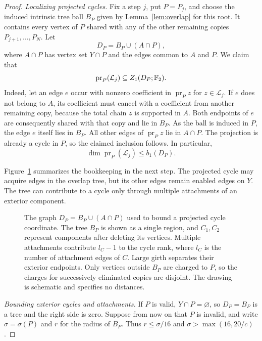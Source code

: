 \begin{proof}
\emph{Localizing projected cycles.}
Fix a step $j$, put $P=P_j$, and choose the induced intrinsic tree ball
$B_P$ given by Lemma~\ref{lem:overlap} for this root.  It contains every
vertex of $P$ shared with any of the other remaining copies
$P_{j+1},\ldots,P_N$.  Let
\[
 D_P=B_P\cup(A\cap P),
\]
where $A\cap P$ has vertex set $Y\cap P$ and the edges common to $A$
and $P$.  We claim that
\begin{equation}
 \operatorname{pr}_P(\mathcal L_j)\subseteq Z_1(D_P;\mathbb F_2).
 \label{eq:projected-cycle-support}
\end{equation}
Indeed, let an edge $e$ occur with nonzero coefficient in
$\operatorname{pr}_P z$ for $z\in\mathcal L_j$.  If $e$ does not belong
to $A$, its coefficient must cancel with a coefficient from another
remaining copy, because the total chain $z$ is supported in $A$.
Both endpoints of $e$ are consequently shared with that copy and lie
in $B_P$.  As the ball is induced in $P$, the edge $e$ itself lies in
$B_P$.  All other edges of $\operatorname{pr}_P z$ lie in $A\cap P$.
The projection is already a cycle in $P$, so the claimed inclusion
follows.  In particular,
\begin{equation}
 \dim\operatorname{pr}_P(\mathcal L_j)\le b_1(D_P).
 \label{eq:projected-cycle-rank}
\end{equation}

Figure~\ref{fig:cycle-charging} summarizes the bookkeeping in the next
step. The projected cycle may acquire edges in the overlap tree, but its
other edges remain enabled edges on $Y$. The tree can contribute to a
cycle only through multiple attachments of an exterior component.

\begin{figure}[ht]
\centering

\caption{The graph $D_P=B_P\cup(A\cap P)$ used to bound a projected
cycle coordinate. The tree $B_P$ is shown as a single region, and
$C_1,C_2$ represent components after deleting its vertices. Multiple
attachments contribute $l_C-1$ to the cycle rank, where $l_C$ is the
number of attachment edges of $C$. Large girth separates
their exterior endpoints. Only vertices outside $B_P$ are charged to
$P$, so the charges for successively eliminated copies are disjoint.
The drawing is schematic and specifies no distances.}
\label{fig:cycle-charging}
\end{figure}

\emph{Bounding exterior cycles and attachments.}
If $P$ is valid, $Y\cap P=\varnothing$, so $D_P=B_P$ is a tree and the
right side is zero.  Suppose from now on that $P$ is invalid, and write
$\sigma=\sigma(P)$ and $r$ for the radius of $B_P$.  Thus
$r\le\sigma/16$ and $\sigma>\max(16,20/c)$.


\end{proof}
